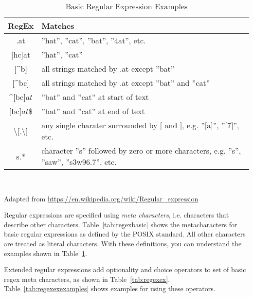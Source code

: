 \begin{table}[h]
\small 
\centering

\renewcommand{\arraystretch}{1.25}

\begin{tabularx}{\textwidth}{c|X} \hline
{\bf RegEx} & {\bf Matches} \\ \hline \hline
.at & ''hat'', ''cat'', ''bat'', ''4at'', etc. \\ \hline
$[$hc$]$at & ''hat'', ''cat'' \\ \hline
$[$\^{ }b$]$ & all strings matched by .at except ''bat'' \\ \hline
$[$\^{ }bc$]$ & all strings matched by .at except ''bat'' and ''cat'' \\ \hline
\^{ }$[$bc$]at$ & ''bat'' and ''cat'' at start of text \\ \hline
$[$bc$]at$\$ & ''bat'' and ''cat'' at end of text \\ \hline
\textbackslash $[$.\textbackslash$]$ & any single charater surrounded by $[$ and $]$, e.g. ''$[$a$]$'', ''$[$7$]$'', etc. \\ \hline
s.* & character ''s'' followed by zero or more characters, e.g. ''s'', ''saw'', ''s3w96.7'', etc. \\ \hline
\end{tabularx} \\
\vspace{.5\baselineskip}

{\footnotesize Adapted from \url{https://en.wikipedia.org/wiki/Regular_expression}} 

\caption{Basic Regular Expression Examples}
\label{tab:regexbasicexamples}
\end{table}

Regular expressions are specified using \emph{meta characters}, i.e. characters that describe other characters. Table~\ref{tab:regexbasic} shows the metacharacters for basic regular expressions as defined by the POSIX standard. All other characters are treated as literal characters. With these definitions, you can understand the examples shown in Table~\ref{tab:regexbasicexamples}.

Extended regular expressions add optionality and choice operators to set of basic regex meta characters, as shown in Table~\ref{tab:regexex}. Table~\ref{tab:regexexexamples} shows examples for using these operators.


